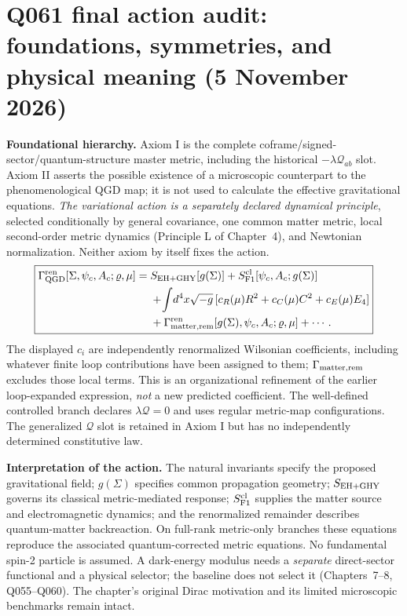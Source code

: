 \documentclass[11pt,a4paper]{article}
\begin{document}
\section*{Q061 final action audit: foundations, symmetries, and physical meaning (5 November 2026)}
\noindent\textbf{Foundational hierarchy.} Axiom I is the complete coframe/signed-sector/quantum-structure master metric, including the historical $-\lambda\mathcal Q_{ab}$ slot. Axiom II asserts the possible existence of a microscopic counterpart to the phenomenological QGD map; it is not used to calculate the effective gravitational equations. \emph{The variational action is a separately declared dynamical principle}, selected conditionally by general covariance, one common matter metric, local second-order metric dynamics (Principle L of Chapter~4), and Newtonian normalization. Neither axiom by itself fixes the action.
\begin{equation}\label{eq:q061-ch1-action}
\boxed{\begin{aligned}
\Gamma_{\rm QGD}^{\rm ren}[\Sigma,\psi_c,A_c;\varrho,\mu]={}&
 S_{\rm EH+GHY}[g(\Sigma)]+S_{\rm F1}^{\rm cl}[\psi_c,A_c;g(\Sigma)]\\
&+\!\int\!d^4x\sqrt{-g}\,[c_R(\mu)R^2+c_C(\mu)C^2+c_E(\mu)E_4]\\
&+\Gamma_{\rm matter,rem}^{\rm ren}[g(\Sigma),\psi_c,A_c;\varrho,\mu]+\cdots .
\end{aligned}}
\end{equation}
The displayed $c_i$ are independently renormalized Wilsonian coefficients, including whatever finite loop contributions have been assigned to them; $\Gamma_{\rm matter,rem}$ excludes those local terms. This is an organizational refinement of the earlier loop-expanded expression, \emph{not} a new predicted coefficient. The well-defined controlled branch declares $\lambda\mathcal Q=0$ and uses regular metric-map configurations. The generalized $\mathcal Q$ slot is retained in Axiom I but has no independently determined constitutive law.

\noindent\textbf{Interpretation of the action.} The natural invariants specify the proposed gravitational field; $g(\Sigma)$ specifies common propagation geometry; $S_{\rm EH+GHY}$ governs its classical metric-mediated response; $S_{\rm F1}^{\rm cl}$ supplies the matter source and electromagnetic dynamics; and the renormalized remainder describes quantum-matter backreaction. On full-rank metric-only branches these equations reproduce the associated quantum-corrected metric equations. No fundamental spin-2 particle is assumed. A dark-energy modulus needs a \emph{separate} direct-sector functional and a physical selector; the baseline does not select it (Chapters~7--8, Q055--Q060). The chapter's original Dirac motivation and its limited microscopic benchmarks remain intact.
\end{document}
